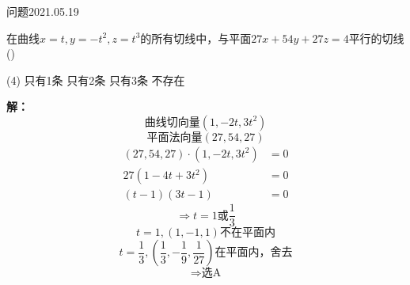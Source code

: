 \begin{mybox}{问题2021.05.19}
	
	\qquad 在曲线$x=t,y=-t^2,z=t^3$的所有切线中，与平面$27x+54y+27z=4$平行的切线()
	\begin{tasks}(4)
		\task 只有1条
		\task 只有2条
		\task 只有3条
		\task 不存在
	\end{tasks}
\end{mybox}
\noindent
\textbf{解：}
$$\text{曲线切向量}(1,-2t,3t^2)$$
$$\text{平面法向量}(27,54,27)$$
\begin{align*}
	(27,54,27)\cdot (1,-2t,3t^2) &=0\\
	27(1-4t+3t^2)&=0\\
	(t-1)(3t-1)&=0
\end{align*}
$$\Rightarrow t=1\text{或}\frac{1}{3}$$
$$t=1,(1,-1,1)\text{不在平面内}$$
$$t=\frac{1}{3},(\frac{1}{3},-\frac{1}{9},\frac{1}{27})\text{在平面内，舍去}$$
$$\Rightarrow \text{选A}$$